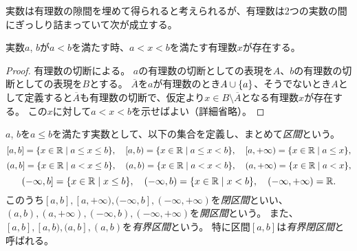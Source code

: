 実数は有理数の隙間を埋めて得られると考えられるが、有理数は2つの実数の間にぎっしり詰まっていて次が成立する。

\begin{proposition}[有理数の稠密性]
\label{t_dense_rational}
実数$a$, $b$が$a < b$を満たす時、$a < x < b$を満たす有理数$x$が存在する。
\end{proposition}

\begin{proof}
有理数の切断による。
$a$の有理数の切断としての表現を$A$、$b$の有理数の切断としての表現を$B$とする。
$\overline{A}$を$a$が有理数のとき$A\cup\{ a \}$、そうでないとき$A$として定義すると$\overline{A}$も有理数の切断で、仮定より$x \in B\setminus\overline{A}$となる有理数$x$が存在する。
この$x$に対して$a < x < b$を示せばよい（詳細省略）。
\end{proof}

$a$, $b$を$a \le b$を満たす実数として、以下の集合を定義し、まとめて\emph{区間}という。
$$
[a, b] = \{ x \in \mathbb{R} \mid a \le x \le b \},
\quad [a, b) = \{ x \in \mathbb{R} \mid a \le x < b \},
\quad [a, +\infty) = \{ x \in \mathbb{R} \mid a \le x \},
$$
$$
(a, b] = \{ x \in \mathbb{R} \mid a < x \le b \},
\quad (a, b) = \{ x \in \mathbb{R} \mid a < x < b \},
\quad (a, +\infty) = \{ x \in \mathbb{R} \mid a < x \},
$$
$$
(-\infty, b] = \{ x \in \mathbb{R} \mid x \le b \},
\quad (-\infty, b) = \{ x \in \mathbb{R} \mid x < b \},
\quad (-\infty, +\infty) = \mathbb{R}.
$$
このうち$[a, b], [a, +\infty), (-\infty, b], (-\infty, +\infty)$を\emph{閉区間}といい、
$(a, b), (a, +\infty), (-\infty, b), (-\infty, +\infty)$を\emph{開区間}という。
また、$[a, b], [a, b), (a, b], (a, b)$を\emph{有界区間}という。
特に区間$[a, b]$は\emph{有界閉区間}と呼ばれる。


